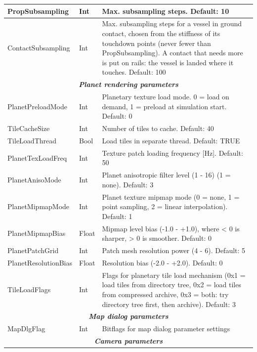 \documentclass[Orbiter User Manual.tex]{subfiles}
\begin{document}
\begin{longtable}{ |p{}|p{}|p{}| }
	\hline\rule{0pt}{2ex}
	PropSubsampling & Int & Max. subsampling steps. Default: 10\\
	\hline\rule{0pt}{2ex}
	ContactSubsampling & Int & Max. subsampling steps for a vessel in ground contact, chosen from the stiffness of its touchdown points (never fewer than PropSubsampling). A contact that needs more is put on rails: the vessel is landed where it touches. Default: 100\\
	\hline
	\multicolumn{3}{|c|}{\rule{0pt}{2ex}\textbf{\textit{Planet rendering parameters}}}\\
	\hline\rule{0pt}{2ex}
	PlanetPreloadMode & Int & Planetary texture load mode. 0 = load on demand, 1 = preload at simulation start. Default: 0\\
	\hline\rule{0pt}{2ex}
	TileCacheSize & Int & Number of tiles to cache. Default: 40\\
	\hline\rule{0pt}{2ex}
	TileLoadThread & Bool & Load tiles in separate thread. Default: TRUE\\
	\hline\rule{0pt}{2ex}
	PlanetTexLoadFreq & Int & Texture patch loading frequency [Hz]. Default: 50\\
	\hline\rule{0pt}{2ex}
	PlanetAnisoMode & Int & Planet anisotropic filter level (1 - 16) (1 = none). Default: 3\\
	\hline\rule{0pt}{2ex}
	PlanetMipmapMode & Int & Planet texture mipmap mode (0 = none, 1 = point sampling, 2 = linear interpolation). Default: 1\\
	\hline\rule{0pt}{2ex}
	PlanetMipmapBias & Float & Mipmap level bias (-1.0 - +1.0), where < 0 is sharper, > 0 is smoother. Default: 0\\
	\hline\rule{0pt}{2ex}
	PlanetPatchGrid & Int & Patch mesh resolution power (4 - 6). Default: 5\\
	\hline\rule{0pt}{2ex}
	PlanetResolutionBias & Float & Resolution bias (-2.0 - +2.0). Default: 0\\
	\hline\rule{0pt}{2ex}
	TileLoadFlags & Int & Flags for planetary tile load mechanism (0x1 = load tiles from directory tree, 0x2 = load tiles from compressed archive, 0x3 = both: try directory tree first, then archive). Default: 3\\
	\hline
	\multicolumn{3}{|c|}{\rule{0pt}{2ex}\textbf{\textit{Map dialog parameters}}}\\
	\hline\rule{0pt}{2ex}
	MapDlgFlag & Int & Bitflags for map dialog parameter settings\\
	\hline
	\multicolumn{3}{|c|}{\rule{0pt}{2ex}\textbf{\textit{Camera parameters}}}\\

\end{longtable}
\end{document}
